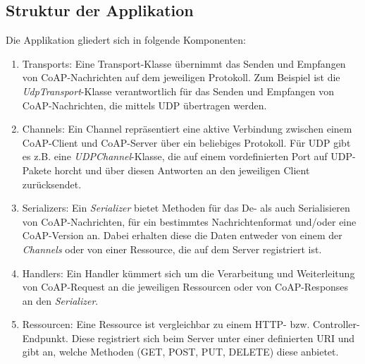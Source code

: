 \subsection{Struktur der Applikation}
\label{subsec:struktur-der-applikation}

Die Applikation gliedert sich in folgende Komponenten:
\begin{enumerate}
    \item Transports: Eine Transport-Klasse übernimmt das Senden und Empfangen von CoAP-Nachrichten auf dem jeweiligen Protokoll. Zum Beispiel ist die \textit{UdpTransport}-Klasse verantwortlich für das Senden und Empfangen von CoAP-Nachrichten, die mittels UDP übertragen werden.
    \item Channels: Ein Channel repräsentiert eine aktive Verbindung zwischen einem CoAP-Client und CoAP-Server über ein beliebiges Protokoll. Für UDP gibt es z.B. eine \textit{UDPChannel}-Klasse, die auf einem vordefinierten Port auf UDP-Pakete horcht und über diesen Antworten an den jeweiligen Client zurücksendet.
    \item Serializers: Ein \textit{Serializer} bietet Methoden für das De- als auch Serialisieren von CoAP-Nachrichten, für ein bestimmtes Nachrichtenformat und/oder eine CoAP-Version an. Dabei erhalten diese die Daten entweder von einem der \textit{Channels} oder von einer Ressource, die auf dem Server registriert ist.
    \item Handlers: Ein Handler kümmert sich um die Verarbeitung und Weiterleitung von CoAP-Request an die jeweiligen Ressourcen oder von CoAP-Responses an den \textit{Serializer}.
    \item Ressourcen: Eine Ressource ist vergleichbar zu einem HTTP- bzw. Controller-Endpunkt. Diese registriert sich beim Server unter einer definierten URI und gibt an, welche Methoden (GET, POST, PUT, DELETE) diese anbietet.
\end{enumerate}

